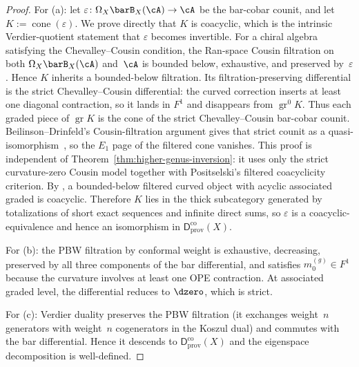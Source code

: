 \begin{proof}
For (a): let
$\varepsilon \colon \Omega_X \barB_X(\cA) \to \cA$
be the bar-cobar counit, and let
$K := \operatorname{cone}(\varepsilon)$.
We prove directly that $K$ is coacyclic, which is the intrinsic
Verdier-quotient statement that $\varepsilon$ becomes invertible.
For a chiral algebra satisfying the Chevalley--Cousin condition,
the Ran-space Cousin filtration on both
$\Omega_X \barB_X(\cA)$ and~$\cA$ is bounded below, exhaustive, and
preserved by~$\varepsilon$. Hence $K$ inherits a bounded-below
filtration. Its filtration-preserving differential is the strict
Chevalley--Cousin differential: the curved correction inserts at
least one diagonal contraction, so it lands in $F^1$ and disappears
from $\operatorname{gr}^0 K$. Thus each graded piece of
$\operatorname{gr} K$ is the cone of the strict
Chevalley--Cousin bar-cobar counit. Beilinson--Drinfeld's
Cousin-filtration argument gives that strict counit as a
quasi-isomorphism~\cite[Theorem~3.7.11]{BD04}, so the $E_1$ page of
the filtered cone vanishes. This proof is independent of
Theorem~\ref{thm:higher-genus-inversion}: it uses only the strict
curvature-zero Cousin model together with Positselski's filtered
coacyclicity criterion. By
\cite[Proposition~3.5]{Positselski11}, a bounded-below filtered
curved object with acyclic associated graded is coacyclic.
Therefore $K$ lies in the thick subcategory generated by
totalizations of short exact sequences and infinite direct sums, so
$\varepsilon$ is a coacyclic-equivalence and hence an isomorphism in
$\mathsf{D}^{\mathrm{co}}_{\mathrm{prov}}(X)$.

For (b): the PBW filtration by conformal weight is exhaustive,
decreasing, preserved by all three components of the bar differential,
and satisfies $m_0^{(g)} \in F^1$ because the curvature involves at
least one OPE contraction. At associated graded level, the
differential reduces to $\dzero$, which is strict.

For (c): Verdier duality preserves the PBW filtration
(it exchanges weight~$n$ generators with weight~$n$ cogenerators in
the Koszul dual) and commutes with the bar differential. Hence it
descends to $\mathsf{D}^{\mathrm{co}}_{\mathrm{prov}}(X)$ and the
eigenspace decomposition is well-defined.
\end{proof}

